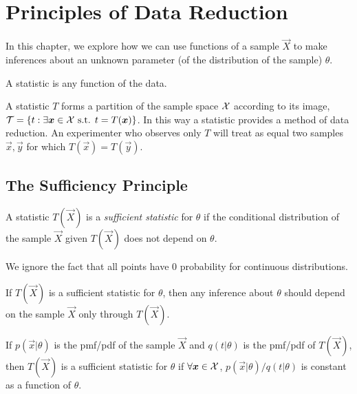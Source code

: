\section{Principles of Data Reduction}

In this chapter, we explore how we can use functions of a sample $\vec{X}$ to make inferences about an unknown parameter (of the distribution of the sample) $\theta$.

\begin{definition}[Statistic]
    A statistic is any function of the data.
\end{definition}

A statistic $T$ forms a partition of the sample space $\mathcal{X}$ according to its image, $\mathcal{T} = \{t: \exists \bm{x} \in \mathcal{X}{} \text{ s.t. } t = T(\bm{x})\}$. In this way a statistic provides a method of data reduction. An experimenter who observes only $T$ will treat as equal two samples $\vec{x}, \vec{y}$ for which $T(\vec{x}) = T(\vec{y})$.

\subsection{The Sufficiency Principle}

\begin{definition}
    A statistic $T(\vec{X})$ is a \emph{sufficient statistic} for $\theta$ if the conditional distribution of the sample $\vec{X}$ given $T(\vec{X})$ does not depend on $\theta$.
\end{definition}

\begin{remark}
    We ignore the fact that all points have 0 probability for continuous distributions.
\end{remark}

\begin{definition}
    If $T(\vec{X})$ is a sufficient statistic for $\theta$, then any inference about $\theta$ should depend on the sample $\vec{X}$ only through $T(\vec{X})$.
\end{definition}

\begin{theorem}
    If $p(\vec{x}\vert{}\theta)$ is the pmf/pdf of the sample $\vec{X}$ and $q(t\vert{} \theta)$ is the pmf/pdf of $T(\vec{X})$, then $T(\vec{X})$ is a sufficient statistic for $\theta$ if $\forall \bm{x} \in \mathcal{X}{}$, $p(\vec{x}\vert{}\theta) / q(t\vert{}\theta)$ is constant as  a function of $\theta$.
\end{theorem}

